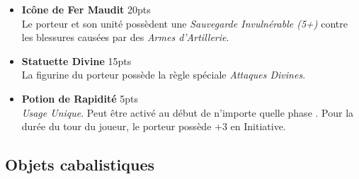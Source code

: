 \begin{multicols}{2}
\begin{itemize}[label={-}]
\item \textbf{Icône de Fer Maudit} \dotfill \unit{20}{pts} \\
Le porteur et son unité possèdent une \emph{Sauvegarde Invulnérable (5+)} contre les blessures causées par des \emph{Armes d'Artillerie}.

\item \textbf{Statuette Divine} \dotfill \unit{15}{pts} \\
La figurine du porteur possède la règle spéciale \emph{Attaques Divines}.

\item \textbf{Potion de Rapidité} \dotfill \unit{5}{pts} \\
\emph{Usage Unique}. Peut être activé au début de n'importe quelle phase . Pour la durée du tour du joueur, le porteur possède +3 en Initiative.

\end{itemize}
\end{multicols}

\newpage

\subsection{Objets cabalistiques}

